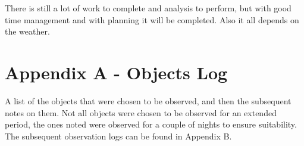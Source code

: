 \documentclass[twocolumn]{revtex4}
\begin{document}
There is still a lot of work to complete and analysis to perform, but with good time management and with planning it will be completed. Also it all depends on the weather.




\clearpage
\onecolumngrid
\vspace{-3ex}
\section*{Appendix A - Objects Log}
\vspace{-2ex}
A list of the objects that were chosen to be observed, and then the subsequent notes on them. Not all objects were chosen to be observed for an extended period, the ones noted were observed for a couple of nights to ensure suitability. The subsequent observation logs can be found in Appendix B.
\end{document}

